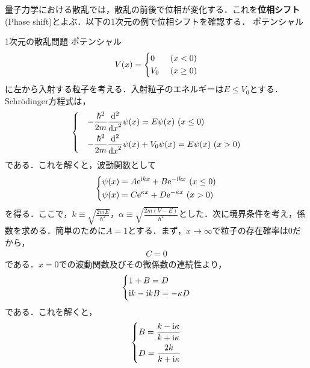 \documentclass{report}
\begin{document}
  量子力学における散乱では，散乱の前後で位相が変化する．これを\textbf{位相シフト}(Phase shift)とよぶ．以下の1次元の例で位相シフトを確認する．
  ポテンシャル
  \begin{myex}{1次元の散乱問題}{}
    ポテンシャル
    \begin{align}
      V(x) = 
      \begin{dcases}
        0\ &(x < 0) \\
        V_0\ &(x \geq 0)
      \end{dcases}
    \end{align}
    に左から入射する粒子を考える．入射粒子のエネルギーは$E \leq V_0$とする．Schrödinger方程式は，
    \begin{align}
      \begin{dcases}
      &-\frac{\hbar^2}{2m}\frac{\mathrm{d}^2}{\dd{x}^2} \psi(x) = E\psi(x)\ (x \leq 0)\\
      &-\frac{\hbar^2}{2m}\frac{\mathrm{d}^2}{\dd{x}^2} \psi(x) + V_0 \psi(x) = E\psi(x)\ (x > 0)
    \end{dcases}
    \end{align}
    である．これを解くと，波動関数として
    \begin{align}
      \begin{dcases}
        \psi(x) = A \mathrm{e}^{\mathrm{i} kx} + B\mathrm{e}^{-\mathrm{i} kx}\ (x\leq0)\\
        \psi(x) = C \mathrm{e}^{\kappa x} + D \mathrm{e}^{-\kappa x}\ (x >0)
      \end{dcases}
    \end{align}
    を得る．ここで，$k \equiv \sqrt{\frac{2mE}{\hbar^2}}，\alpha \equiv \sqrt{\frac{2m(V-E)}{\hbar^2}}$とした．次に境界条件を考え，係数を求める．簡単のために$A=1$とする．まず，$x\to\infty$で粒子の存在確率は0だから，
    \begin{align}
      C = 0
    \end{align}
    である．$x=0$での波動関数及びその微係数の連続性より，
    \begin{align}
      \begin{dcases}
        1 + B = D\\
        \mathrm{i} k -\mathrm{i} kB = -\kappa D
      \end{dcases}
    \end{align}
    である．これを解くと，
    \begin{align}
      \begin{dcases}
        B = \frac{k - \i \kappa}{k + \i\kappa}\\
        D = \frac{2k}{k + \i\kappa}
      \end{dcases}

\end{align}
\end{myex}
\end{document}
